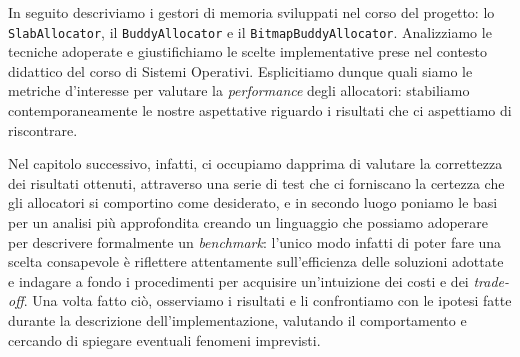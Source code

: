 In seguito descriviamo i gestori di memoria sviluppati nel corso del progetto: lo \texttt{SlabAllocator}, il \texttt{BuddyAllocator} e il \texttt{BitmapBuddyAllocator}. Analizziamo le tecniche adoperate e giustifichiamo le scelte implementative prese nel contesto didattico del corso di Sistemi Operativi. Esplicitiamo dunque quali siamo le metriche d'interesse per valutare la \textit{performance} degli allocatori: stabiliamo contemporaneamente le nostre aspettative riguardo i risultati che ci aspettiamo di riscontrare.

Nel capitolo successivo, infatti, ci occupiamo dapprima di valutare la correttezza dei risultati ottenuti, attraverso una serie di test che ci forniscano la certezza che gli allocatori si comportino come desiderato, e in secondo luogo poniamo le basi per un analisi più approfondita creando un linguaggio che possiamo adoperare per descrivere formalmente un \textit{benchmark}: l'unico modo infatti di poter fare una scelta consapevole è riflettere attentamente sull'efficienza delle soluzioni adottate e indagare a fondo i procedimenti per acquisire un'intuizione dei costi e dei \textit{trade-off}.
Una volta fatto ciò, osserviamo i risultati e li confrontiamo con le ipotesi fatte durante la descrizione dell'implementazione, valutando il comportamento e cercando di spiegare eventuali fenomeni imprevisti. 